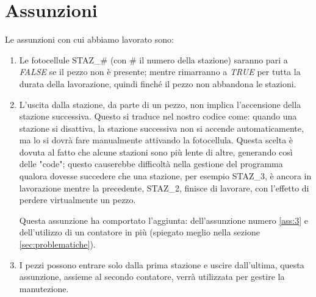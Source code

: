 \documentclass{article}
\begin{document}
\section{Assunzioni}
Le assunzioni con cui abbiamo lavorato sono:
\begin{enumerate}
    \item Le fotocellule STAZ\_\# (con \# il numero della stazione) saranno pari a \textit{FALSE} se il pezzo non è presente; mentre rimarranno a \textit{TRUE} per tutta la durata della lavorazione, quindi finché il pezzo non abbandona le stazioni.

    \item L'uscita dalla stazione, da parte di un pezzo, non implica l'accensione della stazione successiva. Questo si traduce nel nostro codice come: quando una stazione si disattiva, la stazione successiva non si accende automaticamente, ma lo si dovrà fare manualmente attivando la fotocellula. Questa scelta è dovuta al fatto che alcune stazioni sono più lente di altre, generando così delle "code"; questo causerebbe difficoltà nella gestione del programma qualora dovesse succedere che una stazione, per esempio STAZ\_3, è ancora in lavorazione mentre la precedente, STAZ\_2, finisce di lavorare, con l'effetto di perdere virtualmente un pezzo.

    Questa assunzione ha comportato l'aggiunta: dell'assunzione numero \ref{ass:3} e dell'utilizzo di un contatore in più (spiegato meglio nella sezione \ref{sec:problematiche}).

    \item I pezzi possono entrare solo dalla prima stazione e uscire dall'ultima, questa assunzione, assieme al secondo contatore, verrà utilizzata per gestire la manutezione.
    \label{ass:3}
\end{enumerate}
\end{document}
